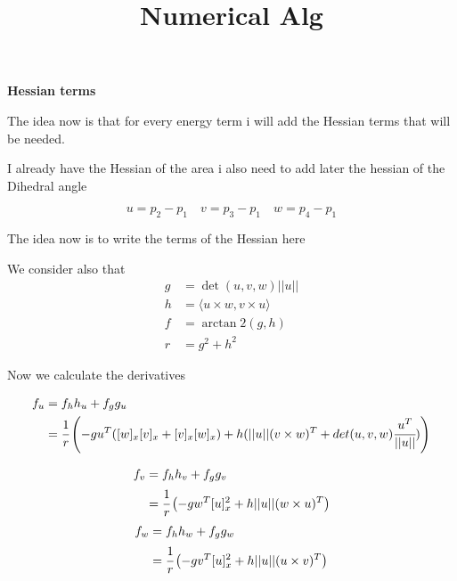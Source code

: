 \documentclass[11pt]{article}
\title{Numerical Alg}
\theoremstyle{plain}
\theoremstyle{definition}
\begin{document}
\fancyhead[L]{ }

\begin{center}
\LARGE\textbf{Hessian terms  \\}
\vspace{3 mm}
\end{center}

    
The idea now is that for every energy term i will add the Hessian terms that will be needed.

I already have the Hessian of the area  i also need to add later the hessian of the Dihedral angle



\begin{equation}
    u = p_2 - p_1 \quad v = p_3 - p_1 \quad w = p_4 - p_1
\end{equation}

The idea now is to write the terms of the Hessian here 


We consider also that 
\begin{align}
    g &= \det(u,v,w)||u|| \\
    h &= \langle u \times w, v \times u \rangle  \\
    f &= \arctan2(g,h) \\
    r &= g^2 + h^2
\end{align}

Now we calculate the derivatives 

\begin{align}
    f_u &= f_h h_u + f_g g_u \\
    &= \cfrac{1}{r}\left( -g u^T ([w]_x[v]_x + [v]_x [w]_x) + h( ||u|| (v\times w)^T + det(u,v,w) \cfrac{u^T}{||u||})  \right)
\end{align}

\begin{align}
    f_v &= f_h h_v + f_g g_v \\
    &= \cfrac{1}{r}\left( -g w^T[u]_x^2 + h||u|| (w\times u)^T\right)
\end{align}
\begin{align}
    f_w &= f_h h_w + f_g g_w \\
    &= \cfrac{1}{r}\left( -g v^T[u]_x^2 + h||u|| (u\times v)^T\right)
\end{align}
\end{document}
